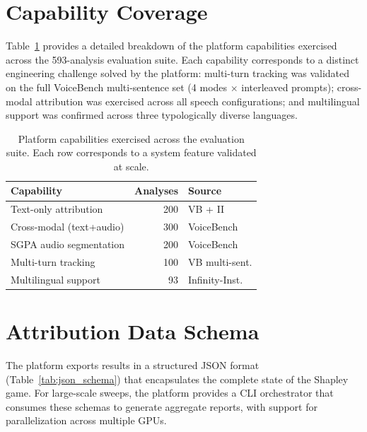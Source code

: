\documentclass[11pt]{article}
\begin{document}
\section{Capability Coverage}
\label{app:capabilities}

Table~\ref{tab:capabilities} provides a detailed breakdown of the platform capabilities exercised across the 593-analysis evaluation suite. Each capability corresponds to a distinct engineering challenge solved by the platform: multi-turn tracking was validated on the full VoiceBench multi-sentence set (4 modes $\times$ interleaved prompts); cross-modal attribution was exercised across all speech configurations; and multilingual support was confirmed across three typologically diverse languages.

\begin{table}[ht]
\centering
\small
\caption{Platform capabilities exercised across the evaluation suite. Each row corresponds to a system feature validated at scale.}
\begin{tabular}{lrl}
\toprule
\textbf{Capability} & \textbf{Analyses} & \textbf{Source} \\
\midrule
Text-only attribution     & 200 & VB + II \\
Cross-modal (text+audio)  & 300 & VoiceBench \\
SGPA audio segmentation   & 200 & VoiceBench \\
Multi-turn tracking       & 100 & VB multi-sent. \\
Multilingual support      & 93  & Infinity-Inst. \\
\bottomrule
\end{tabular}
\label{tab:capabilities}
\end{table}

\section{Attribution Data Schema}
\label{app:schema}

The platform exports results in a structured JSON format (Table~\ref{tab:json_schema}) that encapsulates the complete state of the Shapley game. For large-scale sweeps, the platform provides a CLI orchestrator that consumes these schemas to generate aggregate reports, with support for parallelization across multiple GPUs.
\end{document}
